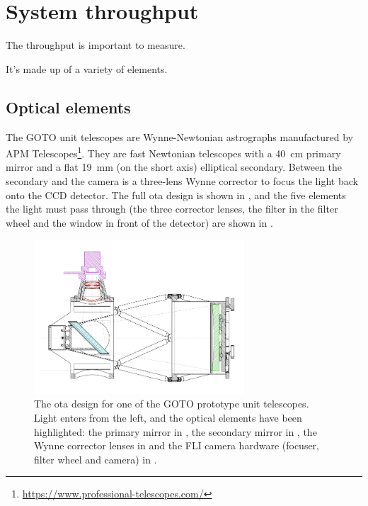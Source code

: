 \section{System throughput}
\label{sec:throughput}
\begin{colsection}


\begin{colsection}

The throughput is important to measure.

It's made up of a variety of elements.

\end{colsection}

\subsection{Optical elements}
\label{sec:optics}
\begin{colsection}

The GOTO unit telescopes are Wynne-Newtonian astrographs manufactured by APM Telescopes\footnote{\url{https://www.professional-telescopes.com/}}. They are fast Newtonian telescopes with a \SI{40}{\centi\meter} primary mirror and a flat \SI{19}{\milli\meter} (on the short axis) elliptical secondary. Between the secondary and the camera is a three-lens Wynne corrector to focus the light back onto the CCD detector. The full \gls{ota} design is shown in , and the five elements the light must pass through (the three corrector lenses, the filter in the filter wheel and the window in front of the detector) are shown in .


\begin{figure}[p]
    \begin{center}
        \includegraphics[width=0.7\textwidth]{images/throughput/OTA_optics.png}
    \end{center}
    \caption[GOTO optical telescope assembly]{
        The \gls{ota} design for one of the GOTO prototype unit telescopes. Light enters from the left, and the optical elements have been highlighted: the primary mirror in , the secondary mirror in , the Wynne corrector lenses in  and the FLI camera hardware (focuser, filter wheel and camera) in .
    }\label{fig:ota}
\end{figure}


\end{colsection}
\end{colsection}
